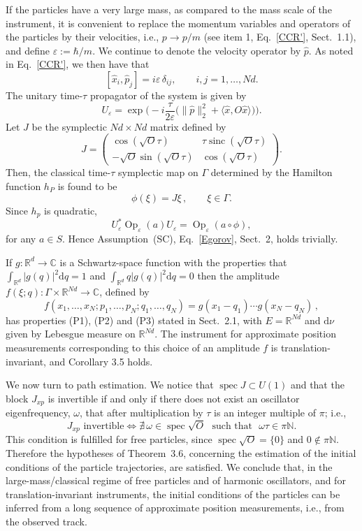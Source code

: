 \documentclass[12pt]{article}
\begin{document}
If the particles have a very large mass, as compared to the mass scale of the instrument, it is convenient to replace 
the momentum variables and operators of the particles by their velocities, i.e., $p\to p/m$ (see item 1, 
Eq.~\eqref{CCR'}, Sect.~1.1), and define $\varepsilon:=\hbar/m$. We continue to denote the velocity operator 
by $\hat{p}$. As noted in Eq.~\eqref{CCR'}, we then have that
$$[\hat x_i, \hat p_j]=i\varepsilon \,\delta_{ij}, \qquad i,j=1,\dots, Nd.$$
The unitary time-$\tau$ propagator of the system is given by
$$U_\varepsilon=\exp\Big(-i \frac{\tau}{2\varepsilon} \big(\| \hat p\|_2^2+
\langle \hat x,O \hat x \rangle\big)\Big).$$
Let $J$ be the symplectic $Nd\times Nd$ matrix defined by
$$J=\begin{pmatrix}
	\cos(\sqrt{O}\tau) & \tau\operatorname{sinc}(\sqrt{O}\tau)\\
	-\sqrt{O}\sin(\sqrt{O}\tau) & \cos(\sqrt{O}\tau)
\end{pmatrix}.$$
Then, the classical time-$\tau$ symplectic map on $\Gamma$ determined by the Hamilton function $h_P$ is found to be
$$\phi(\xi)=J\xi\,, \qquad \xi \in \Gamma.$$
Since $h_p$ is quadratic,
$$U_\varepsilon^*\operatorname{Op}_{\varepsilon}(a)U_\varepsilon=\operatorname{Op}_{\varepsilon}(a\circ\phi),$$
for any $a\in S$. Hence Assumption~(SC), Eq.~\eqref{Egorov}, Sect.~2, holds trivially.

\medskip
If $g:\mathbb{R}^{d}\to\mathbb C$ is a Schwartz-space function with the properties that $\int_{\mathbb R^d}|g(q)|^2\text{d} q=1$ 
and $\int_{\mathbb R^d} q|g(q)|^2\text{d} q=0$ then the amplitude $f(\xi;q):\Gamma\times \mathbb R^{Nd}\to \mathbb C$, 
defined by 
$$f(x_1,\dotsc,x_N; p_1,\dotsc, p_N; q_1,\dotsc, q_N)=g(x_1-q_1)\dotsb g(x_N-q_N)\,,$$ 
has properties (P1), (P2) and (P3) stated in Sect.~2.1, with $E=\mathbb R^{Nd}$ and $\text{d}\nu$ 
given by Lebesgue measure on $\mathbb R^{Nd}$. The instrument for approximate position measurements 
corresponding to this choice of an amplitude $f$ is translation-invariant, and Corollary 3.5 holds. 

We now turn to path estimation. We notice that $\operatorname{spec}J\subset U(1)$ and that the block $J_{xp}$ is 
invertible if and only if there does not exist an oscillator eigenfrequency, $\omega$, that after multiplication by $\tau$
is an integer multiple of $\pi$; i.e.,
$$J_{xp}\mbox{ invertible}\iff\nexists\, \omega\in \operatorname{spec}\sqrt{O}\,\,\mbox{ such that }\,\, \omega\tau\in \pi\mathbb 
N.$$
This condition is fulfilled for free particles, since $\operatorname{spec}\sqrt{O}=\{0\}$ and $0\notin \pi\mathbb N$. 
Therefore the hypotheses of Theorem~3.6, concerning the estimation of the initial conditions of the particle trajectories, 
are satisfied. We conclude that, in the large-mass/classical regime of free particles and of harmonic oscillators, and for 
translation-invariant instruments, the initial conditions of the particles can be inferred from a long sequence of approximate position measurements, i.e., from the observed track. 
\end{document}
